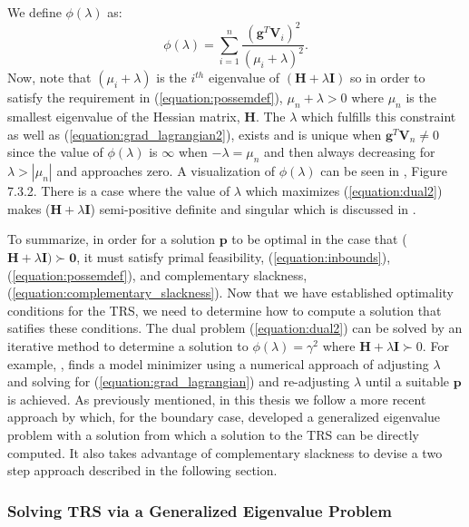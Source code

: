 \documentclass[letterpaper,12pt,titlepage,oneside,final]{book}
\begin{document}
	We define $\phi(\lambda)$ as:
	\begin{equation}
	\phi(\lambda) = \sum_{i=1}^{n}{\frac{(\mathbf{g}^{T}\mathbf{V}_{i})^{2}}{(\mu_{i} + \lambda)^{2}}}.
	\label{phi}
	\end{equation}
	Now, note that $(\mu_{i} + \lambda)$ is the $i^{th}$ eigenvalue of $(\mathbf{H} + \lambda\mathbf{I})$ so in order to satisfy the requirement in (\ref{equation:possemdef}), $\mu_{n} + \lambda > 0$ where $\mu_{n}$ is the smallest eigenvalue of the Hessian matrix, $\mathbf{H}$. The $\lambda$ which fulfills this constraint as well as (\ref{equation:grad_lagrangian2}), exists and is unique when $\mathbf{g}^{T}\mathbf{V}_{n}\neq0$ since the value of $\phi(\lambda)$ is $\infty$ when $-\lambda = \mu_{n}$ and then always decreasing for $\lambda > |\mu_{n}|$ and approaches zero. A visualization of $\phi(\lambda)$ can be seen in \cite{TRM.book}, Figure 7.3.2. There is a case where the value of $\lambda$ which maximizes (\ref{equation:dual2}) makes ($\mathbf{H}+\lambda\mathbf{I}$) semi-positive definite and singular which is discussed in \cite{adachi.paper}. 

	To summarize, in order for a solution $\mathbf{p}$ to be optimal in the case that ($\mathbf{H} + \lambda\mathbf{I}) \succ \mathbf{0}$, it must satisfy primal feasibility, (\ref{equation:inbounds}), (\ref{equation:possemdef}), and complementary slackness, (\ref{equation:complementary_slackness}). Now that we have established optimality conditions for the TRS, we need to determine how to compute a solution that satifies these conditions. The dual problem (\ref{equation:dual2}) can be solved by an iterative method to determine a solution to $\phi(\lambda) = \gamma^{2}$ where $\mathbf{H} + \lambda \mathbf{I} \succ 0$. For example, \cite{TRM.book}, finds a model minimizer using a numerical approach of adjusting $\lambda$ and solving for (\ref{equation:grad_lagrangian}) and re-adjusting $\lambda$ until a suitable $\mathbf{p}$ is achieved. As previously mentioned, in this thesis we follow a more recent approach by \cite{adachi.paper} which, for the boundary case, developed a generalized eigenvalue problem with a solution from which a solution to the TRS can be directly computed. It also takes advantage of complementary slackness to devise a two step approach described in the following section. 
	
	\subsubsection{Solving TRS via a Generalized Eigenvalue Problem}
	
\end{document}
